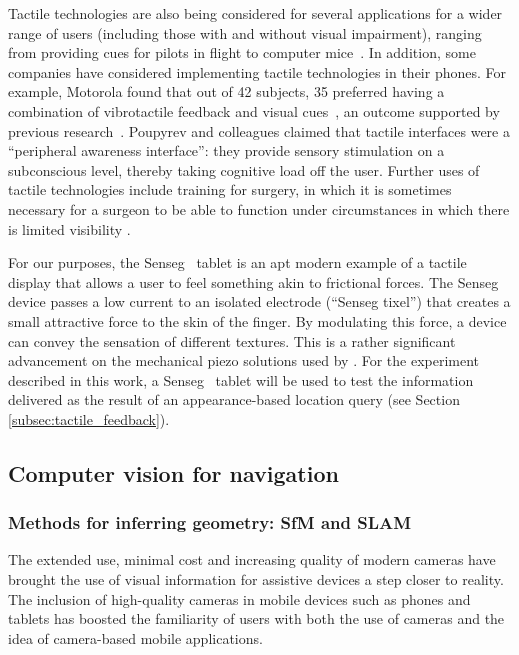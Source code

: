 Tactile technologies are also being considered for several applications for a wider range of users (including those with and without visual impairment), ranging from providing cues for pilots in flight \citep{spirkovska2005summary} to computer mice~\citep{akamatsu1996movement}. In addition, some companies have considered implementing tactile technologies in their phones. For example, Motorola found that out of 42 subjects, 35 preferred having a combination of vibrotactile feedback and visual cues~\citep{chang2005audio}, an outcome supported by previous research~\citep{poupyrev2002ambient}. Poupyrev and colleagues claimed that tactile interfaces were a ``peripheral awareness interface'': they provide sensory stimulation on a subconscious level, thereby taking cognitive load off the user. Further uses of tactile technologies include training for surgery, in which it is sometimes necessary for a surgeon to be able to function under circumstances in which there is limited visibility \citep{hu2006effectiveness}.

For our purposes, the Senseg\texttrademark~ tablet is an apt modern example of a tactile display that allows a user to feel something akin to frictional forces. The Senseg\texttrademark~ device  passes a low current to an isolated electrode (``Senseg tixel'') that creates a small attractive force to the skin of the finger. By modulating this force, a device can convey the sensation of different textures. This is a rather significant advancement on the mechanical piezo solutions used by \citet{bliss1970optical}. For the experiment described in this work, a Senseg\texttrademark~ tablet will be used to test the information delivered as the result of an appearance-based location query (see Section \ref{subsec:tactile_feedback}).

\subsection{Computer vision for navigation}

\subsubsection{Methods for inferring geometry: SfM and SLAM}

The extended use, minimal cost and increasing quality of modern cameras have brought the use of visual information for assistive devices a step closer to reality. The inclusion of high-quality cameras in mobile devices such as phones and tablets has boosted the familiarity of users with both the use of cameras and the idea of camera-based mobile applications. 

